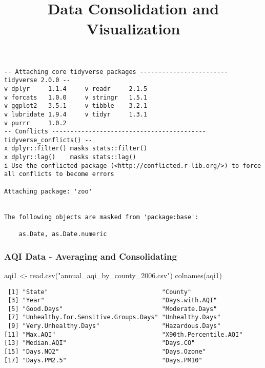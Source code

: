 \documentclass[
  12pt,
]{article}
\title{Data Consolidation and Visualization}
\author{}
\date{}
\newenvironment{Shaded}{\begin{snugshade}}{\end{snugshade}}
\newcommand{\FunctionTok}[1]{\textcolor[rgb]{0.28,0.35,0.67}{#1}}
\newcommand{\NormalTok}[1]{\textcolor[rgb]{0.00,0.23,0.31}{#1}}
\newcommand{\OtherTok}[1]{\textcolor[rgb]{0.00,0.23,0.31}{#1}}
\newcommand{\StringTok}[1]{\textcolor[rgb]{0.13,0.47,0.30}{#1}}
\begin{document}
\maketitle


\begin{verbatim}
-- Attaching core tidyverse packages ------------------------ tidyverse 2.0.0 --
v dplyr     1.1.4     v readr     2.1.5
v forcats   1.0.0     v stringr   1.5.1
v ggplot2   3.5.1     v tibble    3.2.1
v lubridate 1.9.4     v tidyr     1.3.1
v purrr     1.0.2     
-- Conflicts ------------------------------------------ tidyverse_conflicts() --
x dplyr::filter() masks stats::filter()
x dplyr::lag()    masks stats::lag()
i Use the conflicted package (<http://conflicted.r-lib.org/>) to force all conflicts to become errors

Attaching package: 'zoo'


The following objects are masked from 'package:base':

    as.Date, as.Date.numeric
\end{verbatim}

\subsubsection{AQI Data - Averaging and
Consolidating}\label{aqi-data---averaging-and-consolidating}

\begin{Shaded}
\begin{Highlighting}[]
\NormalTok{aqi1 }\OtherTok{\textless{}{-}} \FunctionTok{read.csv}\NormalTok{(}\StringTok{"annual\_aqi\_by\_county\_2006.csv"}\NormalTok{)}
\FunctionTok{colnames}\NormalTok{(aqi1)}
\end{Highlighting}
\end{Shaded}

\begin{verbatim}
 [1] "State"                               "County"                             
 [3] "Year"                                "Days.with.AQI"                      
 [5] "Good.Days"                           "Moderate.Days"                      
 [7] "Unhealthy.for.Sensitive.Groups.Days" "Unhealthy.Days"                     
 [9] "Very.Unhealthy.Days"                 "Hazardous.Days"                     
[11] "Max.AQI"                             "X90th.Percentile.AQI"               
[13] "Median.AQI"                          "Days.CO"                            
[15] "Days.NO2"                            "Days.Ozone"                         
[17] "Days.PM2.5"                          "Days.PM10"                          
\end{verbatim}
\end{document}
